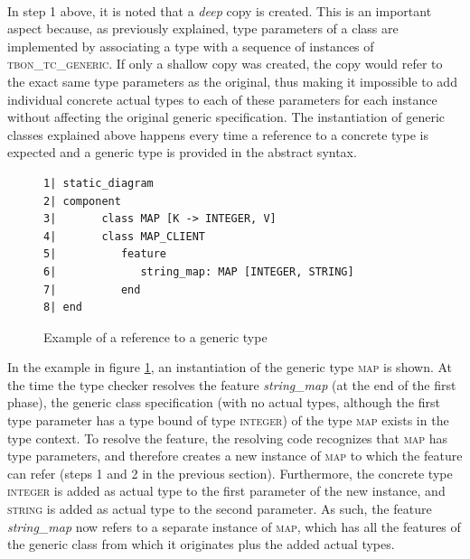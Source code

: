 \paragraph{} In step 1 above, it is noted that a \emph{deep} copy is created. This is an important aspect because, as previously explained, type parameters of a class are implemented by associating a type with a sequence of instances of \textsc{tbon}\_\textsc{tc}\_\textsc{generic}. If only a shallow copy was created, the copy would refer to the exact same type parameters as the original, thus making it impossible to add individual concrete actual types to each of these parameters for each instance without affecting the original generic specification.
The instantiation of generic classes explained above happens every time a reference to a concrete type is expected and a generic type is provided in the abstract syntax.
\begin{figure}[H]
{\footnotesize
\begin{verbatim}
1| static_diagram
2| component
3|       class MAP [K -> INTEGER, V]
4|       class MAP_CLIENT
5|          feature
6|             string_map: MAP [INTEGER, STRING]
7|          end
8| end
\end{verbatim}
}
\caption{Example of a reference to a generic type}
\label{fig:ref_generic_type}
\end{figure}
In the example in figure \ref{fig:ref_generic_type}, an instantiation of the generic type \textsc{map} is shown. At the time the type checker resolves the feature \textit{string\_map} (at the end of the first phase), the generic class specification (with no actual types, although the first type parameter has a type bound of type \textsc{integer}) of the type \textsc{map} exists in the type context. To resolve the feature, the resolving code recognizes that \textsc{map} has type parameters, and therefore creates a new instance of \textsc{map} to which the feature can refer (steps 1 and 2 in the previous section). Furthermore, the concrete type \textsc{integer} is added as actual type to the first parameter of the new instance, and \textsc{string} is added as actual type to the second parameter. As such, the feature  \textit{string\_map} now refers to a separate instance of \textsc{map}, which has all the features of the generic class from which it originates plus the added actual types.
